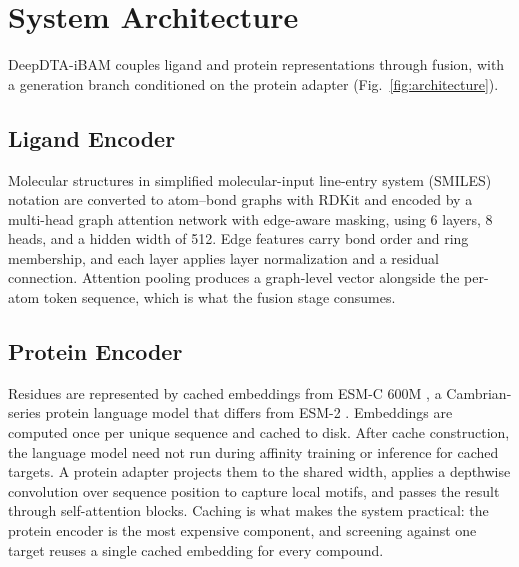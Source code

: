 \documentclass{ieeeaccess}
\begin{document}
\section{System Architecture}
\label{sec:arch}
DeepDTA-iBAM couples ligand and protein representations through fusion, with
a generation branch conditioned on the protein adapter
(Fig.~\ref{fig:architecture}).

\subsection{Ligand Encoder}
Molecular structures in simplified molecular-input line-entry system (SMILES)
notation are converted to atom--bond graphs with RDKit and encoded by a
multi-head graph attention network \cite{velickovic2018gat} with edge-aware
masking, using 6 layers, 8 heads, and a hidden width of 512. Edge features carry
bond order and ring membership, and each layer applies layer normalization and a
residual connection. Attention pooling produces a graph-level vector alongside
the per-atom token sequence, which is what the fusion stage consumes.

\subsection{Protein Encoder}
Residues are represented by cached embeddings from ESM-C 600M
\cite{esm2024cambrian}, a Cambrian-series protein language model that differs
from ESM-2 \cite{lin2023esm}. Embeddings are computed once per
unique sequence and cached to disk. After cache construction, the language
model need not run during affinity training or inference for cached targets.
A protein adapter projects them to the shared width,
applies a depthwise convolution over sequence position to capture local motifs,
and passes the result through self-attention blocks. Caching is what makes the
system practical: the protein encoder is the most expensive component, and
screening against one target reuses a single cached embedding for every
compound.
\end{document}
